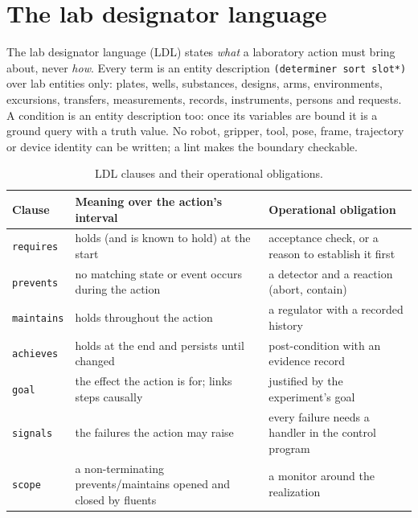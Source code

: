\documentclass[10pt,a4paper]{article}
\begin{document}
\section{The lab designator language}\label{sec:ldl}

The lab designator language (LDL) states \emph{what} a laboratory action must bring about, never \emph{how}. Every term is an entity description \texttt{(determiner sort slot*)} over lab entities only: plates, wells, substances, designs, arms, environments, excursions, transfers, measurements, records, instruments, persons and requests. A condition is an entity description too: once its variables are bound it is a ground query with a truth value. No robot, gripper, tool, pose, frame, trajectory or device identity can be written; a lint makes the boundary checkable.

\begin{table}[tbp]\centering\small
\caption{LDL clauses and their operational obligations.}\label{tab:ldl_clauses}
\begin{tabularx}{\linewidth}{lXX}\toprule
\textbf{Clause} & \textbf{Meaning over the action's interval} & \textbf{Operational obligation} \\\midrule
\texttt{requires} & holds (and is known to hold) at the start & acceptance check, or a reason to establish it first \\
\texttt{prevents} & no matching state or event occurs during the action & a detector and a reaction (abort, contain) \\
\texttt{maintains} & holds throughout the action & a regulator with a recorded history \\
\texttt{achieves} & holds at the end and persists until changed & post-condition with an evidence record \\
\texttt{goal} & the effect the action is for; links steps causally & justified by the experiment's goal \\
\texttt{signals} & the failures the action may raise & every failure needs a handler in the control program \\
\texttt{scope} & a non-terminating prevents/maintains opened and closed by fluents & a monitor around the realization \\\bottomrule
\end{tabularx}
\end{table}
\end{document}
